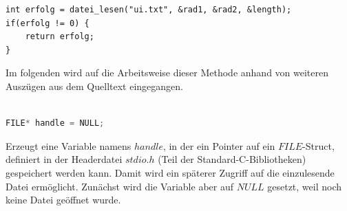 \documentclass[11pt]{scrartcl}
\begin{document}
\begin{lstlisting}
int erfolg = datei_lesen("ui.txt", &rad1, &rad2, &length);
if(erfolg != 0) {
	return erfolg;
}
\end{lstlisting}
Im folgenden wird auf die Arbeitsweise dieser Methode anhand von weiteren Auszügen aus dem Quelltext eingegangen.\\\\

\begin{lstlisting}[language=C]
FILE* handle = NULL;
\end{lstlisting}
Erzeugt eine Variable namens \emph{$handle$}, in der ein Pointer auf ein \emph{$FILE$}-Struct, definiert in der Headerdatei \emph{$stdio.h$} (Teil der Standard-C-Bibliotheken) gespeichert werden kann. Damit wird ein späterer Zugriff auf die einzulesende Datei ermöglicht. Zunächst wird die Variable aber auf \emph{$NULL$} gesetzt, weil noch keine Datei geöffnet wurde.
\end{document}
